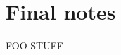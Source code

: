 \documentclass[11pt, chapterheads, final]{ucsd}
\theoremstyle{definition}
\begin{document}
\appendix
\chapter{Final notes}
FOO STUFF

% 
\end{document}
